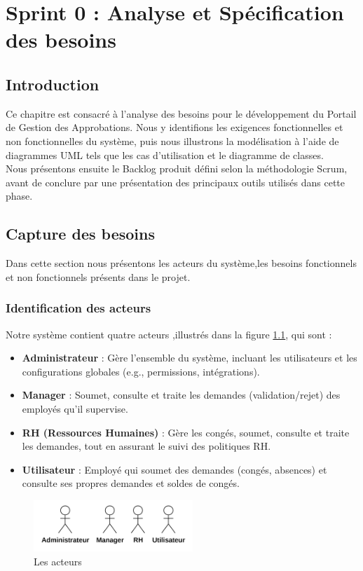 \chapter{Sprint 0 : Analyse et Spécification des besoins}
\section{Introduction}
Ce chapitre est consacré à l’analyse des besoins pour le développement du Portail de Gestion des Approbations. Nous y identifions les exigences fonctionnelles et non fonctionnelles du système, puis nous illustrons la modélisation à l’aide de diagrammes UML tels que les cas d’utilisation et le diagramme de classes.\\
Nous présentons ensuite le Backlog produit défini selon la méthodologie Scrum, avant de conclure par une présentation des principaux outils utilisés dans cette phase.
\section{Capture des besoins}
Dans cette section nous présentons les acteurs du système,les besoins fonctionnels et non
fonctionnels présents dans le projet.
\subsection{Identification des acteurs}
Notre système contient quatre acteurs ,illustrés dans la figure \ref{tab:actors}, qui sont :
\begin{itemize}
    \item \textbf{Administrateur} : Gère l’ensemble du système, incluant les utilisateurs et les configurations globales (e.g., permissions, intégrations).
    \item \textbf{Manager} : Soumet, consulte et traite les demandes (validation/rejet) des employés qu’il supervise.
    \item \textbf{RH (Ressources Humaines)} : Gère les congés, soumet, consulte et traite les demandes, tout en assurant le suivi des politiques RH.
    \item \textbf{Utilisateur} : Employé qui soumet des demandes (congés, absences) et consulte ses propres demandes et soldes de congés.
\end{itemize}
\begin{figure}[h]
\vspace*{-2cm}
    \centering
    \includegraphics[width=6cm]{images/actors.jpg} 
    \caption{Les acteurs}
    \label{tab:actors}
\end{figure}

